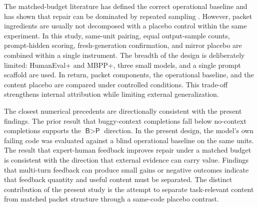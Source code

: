\documentclass{article}
\numberwithin{equation}{section}  %
\theoremstyle{definition}
\newcommand{\armP}{\textsf{P}}
\newcommand{\armB}{\textsf{B}}
\begin{document}
The matched-budget literature has defined the correct operational baseline and has shown that
repair can be dominated by repeated sampling
\citep{olausson2024selfrepair,brown2024monkeys,snell2024testtime,
zheng2025multiturn}. However, packet ingredients are usually not decomposed with a placebo
control within the same experiment. In this study, same-unit pairing, equal output-sample
counts, prompt-hidden scoring, fresh-generation confirmation, and mirror placebo are combined
within a single instrument. The breadth of the design is deliberately limited: HumanEval+ and
MBPP+, three small models, and a single prompt scaffold are used. In return, packet
components, the operational baseline, and the content placebo are compared under controlled
conditions. This trade-off strengthens internal attribution while limiting external
generalization.

The closest numerical precedents are directionally consistent with the present findings. The
prior result that buggy-context completions fall below no-context completions
\citep{dinh2023bugs} supports the $\armB>\armP$ direction. In the present design, the model's
own failing code was evaluated against a blind operational baseline on the same units. The
result that expert-human feedback improves repair under a matched budget
\citep{olausson2024selfrepair} is consistent with the direction that external evidence can
carry value. Findings that multi-turn feedback can produce small gains or negative outcomes
\citep{zheng2025multiturn} indicate that feedback quantity and useful content must be
separated. The distinct contribution of the present study is the attempt to separate
task-relevant content from matched packet structure through a same-code placebo contrast.
\end{document}
